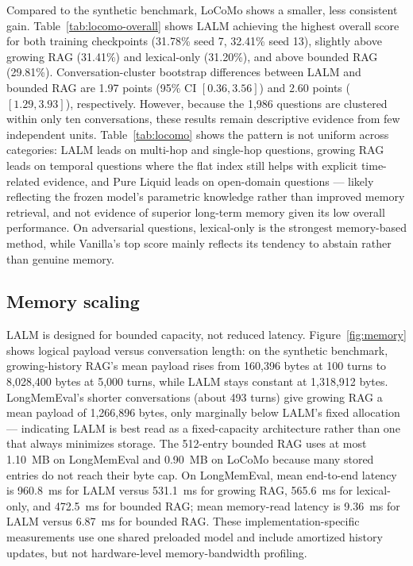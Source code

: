 \documentclass[conference]{IEEEtran}
\begin{document}
Compared to the synthetic benchmark, LoCoMo shows a smaller, less consistent gain. Table~\ref{tab:locomo-overall} shows LALM achieving the highest overall score for both training checkpoints (31.78\% seed 7, 32.41\% seed 13), slightly above growing RAG (31.41\%) and lexical-only (31.20\%), and above bounded RAG (29.81\%). Conversation-cluster bootstrap differences between LALM and bounded RAG are 1.97 points (95\% CI $[0.36,3.56]$) and 2.60 points ($[1.29,3.93]$), respectively. However, because the 1,986 questions are clustered within only ten conversations, these results remain descriptive evidence from few independent units. Table~\ref{tab:locomo} shows the pattern is not uniform across categories: LALM leads on multi-hop and single-hop questions, growing RAG leads on temporal questions where the flat index still helps with explicit time-related evidence, and Pure Liquid leads on open-domain questions --- likely reflecting the frozen model's parametric knowledge rather than improved memory retrieval, and not evidence of superior long-term memory given its low overall performance. On adversarial questions, lexical-only is the strongest memory-based method, while Vanilla's top score mainly reflects its tendency to abstain rather than genuine memory.

\subsection{Memory scaling}
LALM is designed for bounded capacity, not reduced latency. Figure~\ref{fig:memory} shows logical payload versus conversation length: on the synthetic benchmark, growing-history RAG's mean payload rises from 160,396 bytes at 100 turns to 8,028,400 bytes at 5,000 turns, while LALM stays constant at 1,318,912 bytes. LongMemEval's shorter conversations (about 493 turns) give growing RAG a mean payload of 1,266,896 bytes, only marginally below LALM's fixed allocation --- indicating LALM is best read as a fixed-capacity architecture rather than one that always minimizes storage. The 512-entry bounded RAG uses at most 1.10~MB on LongMemEval and 0.90~MB on LoCoMo because many stored entries do not reach their byte cap. On LongMemEval, mean end-to-end latency is 960.8~ms for LALM versus 531.1~ms for growing RAG, 565.6~ms for lexical-only, and 472.5~ms for bounded RAG; mean memory-read latency is 9.36~ms for LALM versus 6.87~ms for bounded RAG. These implementation-specific measurements use one shared preloaded model and include amortized history updates, but not hardware-level memory-bandwidth profiling.
\end{document}
